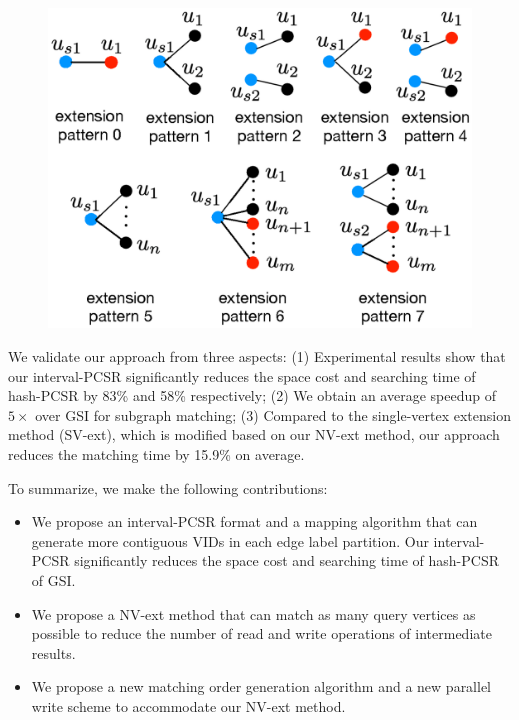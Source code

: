 \begin{figure}
\centering
\includegraphics[width=0.9\columnwidth]{./figure/extpattern.eps}
\caption{}	
\label{fig:extpattern}
\end{figure}

 We validate our approach from three aspects: (1) Experimental results show that our interval-PCSR significantly reduces the space cost and searching time of hash-PCSR by 83\% and 58\% respectively; (2) We obtain an average speedup of $5\times$ over GSI for subgraph matching; (3) Compared to the single-vertex extension method (SV-ext), which is modified based on our NV-ext method, our approach reduces the matching time by 15.9\% on average.

 To summarize, we make the following contributions:
 \begin{itemize}
  \item We propose an interval-PCSR format and a mapping algorithm that can generate more contiguous VIDs in each edge label partition. Our interval-PCSR significantly reduces the space cost and searching time of hash-PCSR of GSI.
  \item We propose a NV-ext method that can match as many query vertices as possible to reduce the number of read and write operations of intermediate results.
  \item We propose a new matching order generation algorithm and a new parallel write scheme to accommodate our NV-ext method.
\end{itemize}
